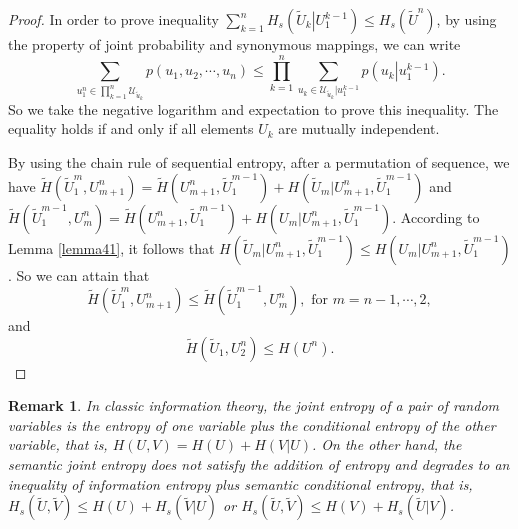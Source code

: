 \documentclass[12pt, draftclsnofoot,onecolumn]{IEEEtran}
\newtheorem{remark}{\bf{Remark}}
\begin{document}
\begin{proof}
In order to prove inequality $\sum_{k=1}^{n} H_s(\tilde{U}_k\left|U_1^{k-1}\right.) \leq H_s(\tilde{U}^n)$, by using the property of joint probability and synonymous mappings, we can write
\begin{equation}
\sum_{u_1^n\in \prod_{k=1}^{n}\mathcal{U}_{\tilde{u}_k}}p(u_1,u_2,\cdots,u_n)\leq \prod_{k=1}^{n} \sum_{u_k\in  \mathcal{U}_{\tilde{u}_k}|u_1^{k-1}}p(u_k\left|u_{1}^{k-1}\right.).
\end{equation}
So we take the negative logarithm and expectation to prove this inequality. The equality holds if and only if all elements $U_k$ are mutually independent.

By using the chain rule of sequential entropy, after a permutation of sequence, we have $\tilde{H}(\tilde{U}_1^m,U_{m+1}^n)=\tilde{H}(U_{m+1}^n,\tilde{U}_1^{m-1})+H(\tilde{U}_m|U_{m+1}^n,\tilde{U}_1^{m-1})$ and $\tilde{H}(\tilde{U}_1^{m-1},U_{m}^n)=\tilde{H}(U_{m+1}^n,\tilde{U}_1^{m-1})+H(U_m|U_{m+1}^n,\tilde{U}_1^{m-1})$. According to Lemma \ref{lemma41}, it follows that $H(\tilde{U}_m|U_{m+1}^n,\tilde{U}_1^{m-1})\leq H(U_m|U_{m+1}^n,\tilde{U}_1^{m-1})$. So we can attain that
\begin{equation}
\tilde{H}(\tilde{U}_1^m,U_{m+1}^n)\leq \tilde{H}(\tilde{U}_1^{m-1},U_{m}^n), \text{ for } m=n-1,\cdots,2,
\end{equation}
and
\begin{equation}
\tilde{H}(\tilde{U}_1,U_{2}^n)\leq H(U^n).
\end{equation}
\end{proof}

\begin{remark}
In classic information theory, the joint entropy of a pair of random variables is the entropy of one variable plus the conditional entropy of the other variable, that is, $H\left(U,V\right)=H(U)+H(V|U)$. On the other hand, the semantic joint entropy does not satisfy the addition of entropy and degrades to an inequality of information entropy plus semantic conditional entropy, that is, $ H_s(\tilde{U},\tilde{V})\leq H(U)+H_s(\tilde{V}\left|U\right.)$ or $H_s(\tilde{U},\tilde{V})\leq H(V)+H_s(\tilde{U}\left|V\right.)$.
\end{remark}
\end{document}
